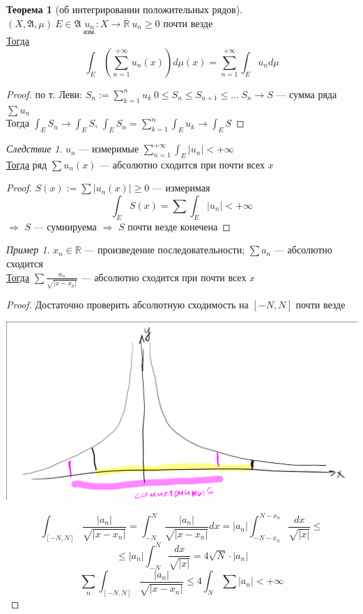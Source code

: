 \documentclass[oneside]{book}
\newcommand{\R}{\mathbb{R}}
\newcommand{\A}{\mathfrak{A}}
\theoremstyle{plain}
\theoremstyle{remark}
\newtheorem{corollary}{Следствие}[theorem]
\newtheorem*{examp}{Пример}
\theoremstyle{definition}
\newtheorem{theorem}{Теорема}[section]
\begin{document}
\begin{theorem}[об интегрировании положительных рядов]
\((X, \A, \mu)\ E \in \A\ \underset{\text{изм.}}{u_n}: X \to \overline{\R}\ u_n \ge 0\) почти везде \\
\uline{Тогда} \[ \int_E(\sum_{n = 1}^{ + \infty} u_n(x))d\mu(x) = \sum_{n = 1}^{ + \infty} \int_E u_n d\mu \]
\end{theorem}
\begin{proof}
по т. Леви: \(S_n := \sum_{k = 1}^n u_k\ 0 \le S_n \le S_{n + 1} \le \dots\ S_n \to S\) --- сумма ряда \(\sum u_n\) \\
Тогда \(\int_E S_n \to \int_E S\), \(\int_E S_n = \sum_{k = 1}^n \int_E u_k \to \int_E S\)
\end{proof}
\begin{corollary}
\(u_n\) --- измеримые \(\sum_{n = 1}^{ + \infty} \int_E |u_n| < + \infty\) \\
\uline{Тогда} ряд \(\sum u_n(x)\) --- абсолютно сходится при почти всех \(x\)
\end{corollary}
\begin{proof}
\(S(x) := \sum |u_n(x)| \ge 0\) --- измеримая
\[ \int_E S(x) = \sum \int_E |u_n| < + \infty \]
\(\Rightarrow\) \(S\) --- сумиируема \(\Rightarrow\) \(S\) почти везде конечена
\end{proof}
\begin{examp}
\(x_n \in \R\) --- произведение последовательности; \(\sum a_n\) --- абсолютно сходится \\
\uline{Тогда} \(\sum \frac{a_n}{\sqrt{|x - x_n|}}\) --- абсолютно сходится при почти всех \(x\)
\end{examp}
\begin{proof}
Достаточно проверить абсолютную сходимость на \([-N, N]\) почти везде
\begin{center}
\includegraphics[scale=0.3]{3_3.png}
\end{center}
\[ \int_{[-N , N]} \frac{|a_n|}{\sqrt{|x - x_n|}} = \int_{-N}^N \frac{|a_n|}{\sqrt{|x - x_n|}} dx = |a_n| \int_{-N - x_n}^{N - x_n} \frac{dx}{\sqrt{|x|}} \le \]
\[ \le |a_n| \int_{-N}^N \frac{dx}{\sqrt{|x|}} = 4\sqrt{N}\cdot|a_n| \]
\[ \sum_n \int_{[-N, N]}\frac{|a_n|}{\sqrt{|x - x_n|}} \le 4 \int_N \sum |a_n| < + \infty \]
\end{proof}
\end{document}
